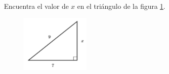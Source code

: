 \question[15]  Encuentra el valor de $x$ en el triángulo de la figura \ref{fig:lados_pitagoras_35}.
\begin{figure}[H]
    \begin{center}
        \includegraphics[width=0.3\textwidth]{../images/lados_pitagoras_35.png}
    \end{center}
    \caption{}
    \label{fig:lados_pitagoras_35}
\end{figure}